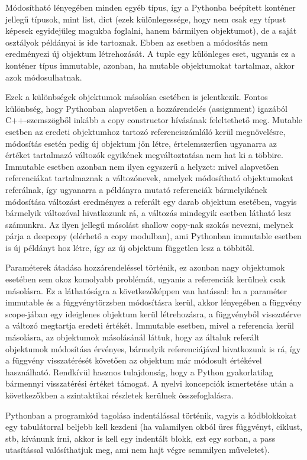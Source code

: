 \documentclass[12pt,a4paper,oneside]{report}             %
\begin{document}
Módosítható lényegében minden egyéb típus, így a Pythonba beépített konténer jellegű típusok, mint list, dict (ezek különlegessége, hogy nem csak egy típust képesek egyidejűleg magukba foglalni, hanem bármilyen objektumot), de a saját osztályok példányai is ide tartoznak. Ebben az esetben a módosítás nem eredményezi új objektum létrehozását. A tuple egy különleges eset, ugyanis ez a konténer típus immutable, azonban, ha mutable objektumokat tartalmaz, akkor azok módosulhatnak.

Ezek a különbségek objektumok másolása esetében is jelentkezik. Fontos különbség, hogy Pythonban alapvetően a hozzárendelés (assignment) igazából C++-szemszögből inkább a copy constructor hívásának feleltethető meg. Mutable esetben az eredeti objektumhoz tartozó referenciszámláló kerül megnövelésre, módosítás esetén pedig új objektum jön létre, értelemszerűen ugyanarra az értéket tartalmazó változók egyikének megváltoztatása nem hat ki a többire. Immutable esetben azonban nem ilyen egyszerű a helyzet: mivel alapvetően referenciákat tartalmaznak a változónevek, amelyek módosítható objektumokat referálnak, így ugyanarra a példányra mutató referenciák bármelyikének módosítása változást eredményez a referált egy darab objektum esetében, vagyis bármelyik változóval hivatkozunk rá, a változás mindegyik esetben látható lesz számunkra. Az ilyen jellegű másolást shallow copy-nak szokás nevezni, melynek párja a deepcopy (elérhető a copy modulban), ami Pythonban immutable esetben is új példányt hoz létre, így az új objektum független lesz a többitől.

Paraméterek átadása hozzárendeléssel történik, ez azonban nagy objektumok esetében sem okoz komolyabb problémát, ugyanis a referenciák kerülnek csak másolásra. Ez a láthatóságra a következőképpen van hatással: ha a paraméter immutable és a függvénytörzsben módosításra kerül, akkor lényegében a függvény scope-jában egy ideiglenes objektum kerül létrehozásra, a függvényből visszatérve a változó megtartja eredeti értékét. Immutable esetben, mivel a referencia kerül másolásra, az objektumok másolásánál láttuk, hogy az általuk referált objektumok módosítása érvényes, bármelyik referenciájával hivatkozunk is rá, így a függvény visszatérését követően az objektum már módosult értékével használható.
Rendkívül hasznos tulajdonság, hogy a Python gyakorlatilag bármennyi visszatérési értéket támogat.
A nyelvi koncepciók ismertetése után a következőkben a szintaktikai részletek kerülnek összefoglalásra.

Pythonban a programkód tagolása indentálással történik, vagyis a kódblokkokat egy tabulátorral beljebb kell kezdeni (ha valamilyen okból üres függvényt, ciklust, stb, kívánunk írni, akkor is kell egy indentált blokk, ezt egy sorban, a pass utasítással valósíthatjuk meg, ami nem hajt végre semmilyen műveletet).
\end{document}
